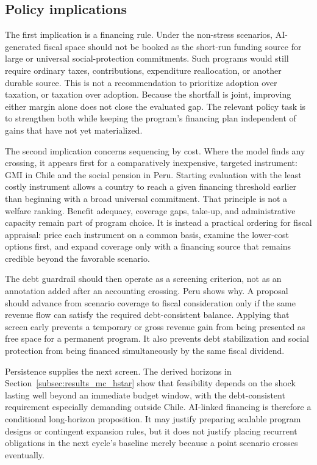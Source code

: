 \subsection{Policy implications}\label{subsec:discussion_policy}

The first implication is a financing rule. Under the non-stress scenarios, AI-generated fiscal space should not be booked as the short-run funding source for large or universal social-protection commitments. Such programs would still require ordinary taxes, contributions, expenditure reallocation, or another durable source. This is not a recommendation to prioritize adoption over taxation, or taxation over adoption. Because the shortfall is joint, improving either margin alone does not close the evaluated gap. The relevant policy task is to strengthen both while keeping the program's financing plan independent of gains that have not yet materialized.

The second implication concerns sequencing by cost. Where the model finds any crossing, it appears first for a comparatively inexpensive, targeted instrument: GMI in Chile and the social pension in Peru. Starting evaluation with the least costly instrument allows a country to reach a given financing threshold earlier than beginning with a broad universal commitment. That principle is not a welfare ranking. Benefit adequacy, coverage gaps, take-up, and administrative capacity remain part of program choice. It is instead a practical ordering for fiscal appraisal: price each instrument on a common basis, examine the lower-cost options first, and expand coverage only with a financing source that remains credible beyond the favorable scenario.

The debt guardrail should then operate as a screening criterion, not as an annotation added after an accounting crossing. Peru shows why. A proposal should advance from scenario coverage to fiscal consideration only if the same revenue flow can satisfy the required debt-consistent balance. Applying that screen early prevents a temporary or gross revenue gain from being presented as free space for a permanent program. It also prevents debt stabilization and social protection from being financed simultaneously by the same fiscal dividend.

Persistence supplies the next screen. The derived horizons in Section~\ref{subsec:results_mc_hstar} show that feasibility depends on the shock lasting well beyond an immediate budget window, with the debt-consistent requirement especially demanding outside Chile. AI-linked financing is therefore a conditional long-horizon proposition. It may justify preparing scalable program designs or contingent expansion rules, but it does not justify placing recurrent obligations in the next cycle's baseline merely because a point scenario crosses eventually.

